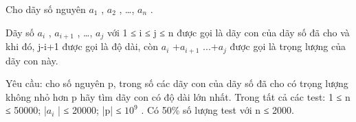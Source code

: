Cho dãy số nguyên $a_{1}$   , $a_{2}$   , …, $a_{n}$   .  

   Dãy số $a_{i}$   , $a_{i+1}$   , …, $a_{j}$   với 1 ≤ i ≤ j ≤ n được gọi là dãy con của dãy số đã cho và khi đó, j-i+1 được gọi là độ dài, còn   $a_{i}$   +$a_{i+1}$   ...+$a_{j}$   được gọi là trọng lượng của dãy con này.  

   Yêu cầu: cho số nguyên p, trong số các dãy con của dãy số đã cho có trọng lượng không nhỏ hơn p hãy tìm dãy con có độ dài lớn nhất.
Trong tất cả các test: 1 ≤ n ≤ 50000;  |$a_{i}$   | ≤ 20000; |p| ≤ $10^{9}$   . Có 50\% số lượng test với n ≤ 2000.